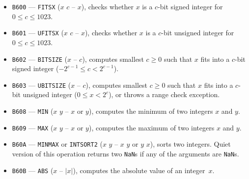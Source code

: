 \documentclass[12pt,oneside]{article}
\begin{document}
\begin{itemize}
\item {\tt B600} --- {\tt FITSX} ($x$ $c$ -- $x$), checks whether $x$ is a $c$-bit signed integer for $0\leq c\leq 1023$.
\item {\tt B601} --- {\tt UFITSX} ($x$ $c$ -- $x$), checks whether $x$ is a $c$-bit unsigned integer for $0\leq c\leq 1023$.
\item {\tt B602} --- {\tt BITSIZE} ($x$ -- $c$), computes smallest $c\geq0$ such that $x$ fits into a $c$-bit signed integer ($-2^{c-1}\leq c<2^{c-1}$).
\item {\tt B603} --- {\tt UBITSIZE} ($x$ -- $c$), computes smallest $c\geq0$ such that $x$ fits into a $c$-bit unsigned integer ($0\leq x<2^c$), or throws a range check exception.
\item {\tt B608} --- {\tt MIN} ($x$ $y$ -- $x$ or $y$), computes the minimum of two integers $x$ and $y$.
\item {\tt B609} --- {\tt MAX} ($x$ $y$ -- $x$ or $y$), computes the maximum of two integers $x$ and $y$.
\item {\tt B60A} --- {\tt MINMAX} or {\tt INTSORT2} ($x$ $y$ -- $x$ $y$ or $y$ $x$), sorts two integers. Quiet version of this operation returns two {\tt NaN}s if any of the arguments are {\tt NaN}s.
\item {\tt B60B} --- {\tt ABS} ($x$ -- $|x|$), computes the absolute value of an integer~$x$.
\end{itemize}
\end{document}
